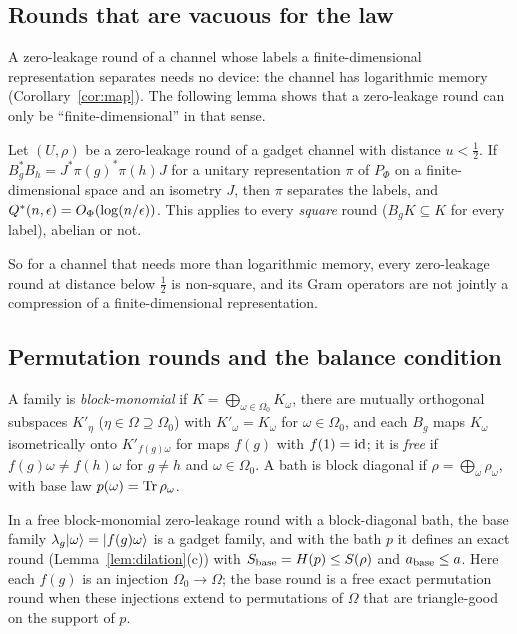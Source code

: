 \subsection{Rounds that are vacuous for the law}

A zero-leakage round of a channel whose labels a finite-dimensional representation separates needs no device: the channel has logarithmic
memory (Corollary~\ref{cor:map}). The following lemma shows that a zero-leakage round can only be ``finite-dimensional'' in that sense.

\begin{lemma}\label{lem:vacuous}
Let $(U,\rho)$ be a zero-leakage round of a gadget channel with distance $u<\frac12$. If $B_g^*B_h=J^*\pi(g)^*\pi(h)J$ for a unitary representation
$\pi$ of $P_\Phi$ on a finite-dimensional space and an isometry $J$, then $\pi$ separates the labels, and $Q^{*}(n,\epsilon)=O_\Phi(\log(n/\epsilon))$. This
applies to every \emph{square} round ($B_gK\subseteq K$ for every label), abelian or not.
\end{lemma}

So for a channel that needs more than logarithmic memory, every zero-leakage round at distance below $\frac12$ is non-square, and its Gram
operators are not jointly a compression of a finite-dimensional representation.

\subsection{Permutation rounds and the balance condition}

A family is \emph{block-monomial} if $K=\bigoplus_{\omega\in\Omega_0}K_\omega$, there are mutually orthogonal subspaces $K'_\eta$ ($\eta\in\Omega\supseteq\Omega_0$)
with $K'_\omega=K_\omega$ for $\omega\in\Omega_0$, and each $B_g$ maps $K_\omega$ isometrically onto $K'_{f(g)\omega}$ for maps $f(g)$ with $f(1)=\mathrm{id}$; it is
\emph{free} if $f(g)\omega\ne f(h)\omega$ for $g\ne h$ and $\omega\in\Omega_0$. A bath is block diagonal if $\rho=\bigoplus_\omega\rho_\omega$, with base law
$p(\omega)=\operatorname{Tr}\rho_\omega$.

\begin{lemma}\label{lem:block-monomial}
In a free block-monomial zero-leakage round with a block-diagonal bath, the base family $\lambda_g\lvert \omega\rangle=\lvert f(g)\omega\rangle$ is a gadget family, and
with the bath $p$ it defines an exact round (Lemma~\ref{lem:dilation}(c)) with $S_{\rm base}=H(p)\le S(\rho)$ and $a_{\rm base}\le a$. Here each $f(g)$ is an
injection $\Omega_0\to\Omega$; the base round is a free exact permutation round when these injections extend to permutations of $\Omega$
that are triangle-good on the support of $p$.
\end{lemma}

